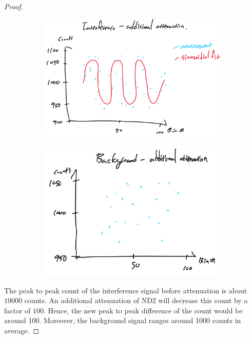 \documentclass{article}
\numberwithin{equation}{section}
\begin{document}
\begin{proof}
\begin{figure}[htp]
\begin{subfigure}[b]{0.45\textwidth}
            \includegraphics[width=\textwidth]{B_ND.png}
            \label{fig:fig3}
        \end{subfigure}
        \hfill
        \begin{subfigure}[b]{0.45\textwidth}
            \includegraphics[width=\textwidth]{B_bg_ND.png}
            \label{fig:fig4}
        \end{subfigure}
    \end{figure}
    
    The peak to peak count of the interference signal before attenuation 
    is about $10000$ counts. An additional attenuation of ND2 will 
    decrease this count by a factor of $100$. Hence, the new 
    peak to peak difference of the count would be around 100. 
    Moreover, the background signal ranges around 1000 counts in average. 
\end{proof}
\end{document}
